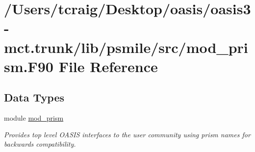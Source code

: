 \hypertarget{mod__prism_8_f90}{\section{/\+Users/tcraig/\+Desktop/oasis/oasis3-\/mct.trunk/lib/psmile/src/mod\+\_\+prism.F90 File Reference}
\label{mod__prism_8_f90}
}
\subsection*{Data Types}
\begin{DoxyCompactItemize}
\item 
module \hyperlink{classmod__prism}{mod\+\_\+prism}
\begin{DoxyCompactList}\small\item\em Provides top level O\+A\+S\+I\+S interfaces to the user community using prism names for backwards compatibility. \end{DoxyCompactList}\end{DoxyCompactItemize}
